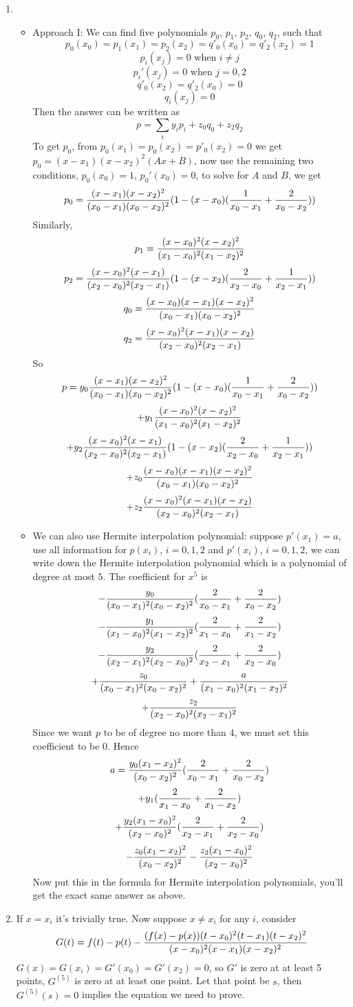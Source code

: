 \documentclass{article} %
\theoremstyle{break}
\begin{document}
\begin{enumerate}
\item \begin{itemize}
  \item Approach I: We can find five polynomials $p_0$, $p_1$, $p_2$, $q_0$, $q_2$, such that
    \[p_0(x_0)=p_1(x_1)=p_2(x_2)=q'_0(x_0)=q'_2(x_2)=1\]
    \[p_i(x_j)=0\text{ when }i\not=j\]
    \[p_i'(x_j)=0\text{ when }j=0, 2\]
    \[q'_0(x_2)=q'_2(x_0)=0\]
    \[q_i(x_j)=0\]
    Then the answer can be written as
    \[p=\sum_iy_ip_i+z_0q_0+z_2q_2\]
    To get $p_0$, from $p_0(x_1)=p_0(x_2)=p'_0(x_2)=0$ we get $p_0=(x-x_1)(x-x_2)^2(Ax+B)$, now use the remaining two conditions, $p_0(x_0)=1$, $p_0'(x_0)=0$, to solve for $A$ and $B$, we get
    \[p_0={(x-x_1)(x-x_2)^2\over (x_0-x_1)(x_0-x_2)^2}(1-(x-x_0)({1\over x_0-x_1}+{2\over x_0-x_2}))\]
    Similarly,
    \[p_1={(x-x_0)^2(x-x_2)^2\over (x_1-x_0)^2(x_1-x_2)^2}\]
    \[p_2={(x-x_0)^2(x-x_1)\over (x_2-x_0)^2(x_2-x_1)}(1-(x-x_2)({2\over x_2-x_0}+{1\over x_2-x_1}))\]
    \[q_0={(x-x_0)(x-x_1)(x-x_2)^2\over (x_0-x_1)(x_0-x_2)^2}\]
    \[q_2={(x-x_0)^2(x-x_1)(x-x_2)\over (x_2-x_0)^2(x_2-x_1)}\]
    So
    \[p=y_0{(x-x_1)(x-x_2)^2\over (x_0-x_1)(x_0-x_2)^2}(1-(x-x_0)({1\over x_0-x_1}+{2\over x_0-x_2}))\]
    \[+y_1{(x-x_0)^2(x-x_2)^2\over (x_1-x_0)^2(x_1-x_2)^2}\]
    \[+y_2{(x-x_0)^2(x-x_1)\over (x_2-x_0)^2(x_2-x_1)}(1-(x-x_2)({2\over x_2-x_0}+{1\over x_2-x_1}))\]
    \[+z_0{(x-x_0)(x-x_1)(x-x_2)^2\over (x_0-x_1)(x_0-x_2)^2}\]
    \[+z_2{(x-x_0)^2(x-x_1)(x-x_2)\over (x_2-x_0)^2(x_2-x_1)}\]
  \item We can also use Hermite interpolation polynomial: suppose $p'(x_1)=a$, use all information for $p(x_i)$, $i=0, 1, 2$ and $p'(x_i)$, $i=0, 1, 2$, we can write down the Hermite interpolation polynomial which is a polynomial of degree at most $5$. The coefficient for $x^5$ is
    \[-{y_0\over (x_0-x_1)^2(x_0-x_2)^2}({2\over x_0-x_1}+{2\over x_0-x_2})\]
    \[-{y_1\over (x_1-x_0)^2(x_1-x_2)^2}({2\over x_1-x_0}+{2\over x_1-x_2})\]
    \[-{y_2\over (x_2-x_1)^2(x_2-x_0)^2}({2\over x_2-x_1}+{2\over x_2-x_0})\]
    \[+{z_0\over (x_0-x_1)^2(x_0-x_2)^2}+{a\over (x_1-x_0)^2(x_1-x_2)^2}\]
    \[+{z_2\over (x_2-x_0)^2(x_2-x_1)^2}\]
    Since we want $p$ to be of degree no more than $4$, we must set this coefficient to be $0$. Hence
    \[a={y_0(x_1-x_2)^2\over (x_0-x_2)^2}({2\over x_0-x_1}+{2\over x_0-x_2})\]
      \[+y_1({2\over x_1-x_0}+{2\over x_1-x_2})\]
      \[+{y_2(x_1-x_0)^2\over (x_2-x_0)^2}({2\over x_2-x_1}+{2\over x_2-x_0})\]
      \[-{z_0(x_1-x_2)^2\over (x_0-x_2)^2}-{z_2(x_1-x_0)^2\over (x_2-x_0)^2}\]
      Now put this in the formula for Hermite interpolation polynomials, you'll get the exact same answer as above.
 \end{itemize}

    \item If $x=x_i$ it's trivially true. Now suppose $x\not=x_i$ for any $i$, consider
      \[G(t)=f(t)-p(t)-{(f(x)-p(x))(t-x_0)^2(t-x_1)(t-x_2)^2\over (x-x_0)^2(x-x_1)(x-x_2)^2}\]
      $G(x)=G(x_i)=G'(x_0)=G'(x_2)=0$, so $G'$ is zero at at least 5 points, $G^{(5)}$ is zero at at least one point. Let that point be $s$, then $G^{(5)}(s)=0$ implies the equation we need to prove.
\end{enumerate}
\end{document}
